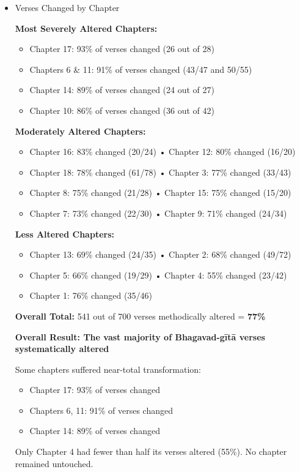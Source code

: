 \documentclass[11pt,twoside]{book}
\begin{document}
\newpage
\begin{itemize}
\item Verses Changed by Chapter
\label{sec:org4815461}

\textbf{\textbf{Most Severely Altered Chapters:}}
\begin{itemize}
\item Chapter 17: 93\% of verses changed (26 out of 28)
\item Chapters 6 \& 11: 91\% of verses changed (43/47 and 50/55)
\item Chapter 14: 89\% of verses changed (24 out of 27)
\item Chapter 10: 86\% of verses changed (36 out of 42)
\end{itemize}

\textbf{\textbf{Moderately Altered Chapters:}}
\begin{itemize}
\item Chapter 16: 83\% changed (20/24) • Chapter 12: 80\% changed (16/20)
\item Chapter 18: 78\% changed (61/78) • Chapter 3: 77\% changed (33/43)
\item Chapter 8: 75\% changed (21/28) • Chapter 15: 75\% changed (15/20)
\item Chapter 7: 73\% changed (22/30) • Chapter 9: 71\% changed (24/34)
\end{itemize}

\textbf{\textbf{Less Altered Chapters:}}
\begin{itemize}
\item Chapter 13: 69\% changed (24/35) • Chapter 2: 68\% changed (49/72)
\item Chapter 5: 66\% changed (19/29) • Chapter 4: 55\% changed (23/42)
\item Chapter 1: 76\% changed (35/46)
\end{itemize}

\textbf{\textbf{Overall Total:}} 541 out of 700 verses methodically altered = \textbf{\textbf{77\%}}

\textbf{\textbf{\textbf{Overall Result: The vast majority of Bhagavad-gītā verses systematically altered}}}

Some chapters suffered near-total transformation:
\begin{itemize}
\item Chapter 17: 93\% of verses changed
\item Chapters 6, 11: 91\% of verses changed
\item Chapter 14: 89\% of verses changed
\end{itemize}

Only Chapter 4 had fewer than half its verses altered (55\%). No chapter remained untouched.
\end{itemize}
\end{document}
